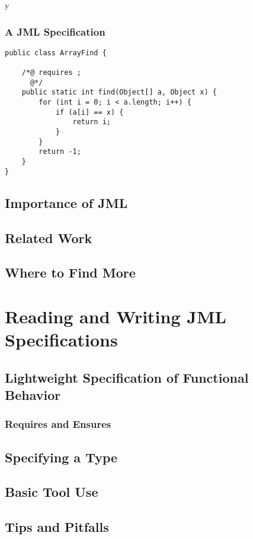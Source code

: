 \if y\MAKEHANDOUTS \documentclass[compress,landscape,handout]{beamer}
\begin{document}
\begin{frame}[fragile]
\frametitle{A JML Specification}
\begin{lstlisting}
public class ArrayFind {

    /*@ requires ;
      @*/
    public static int find(Object[] a, Object x) {
        for (int i = 0; i < a.length; i++) {
            if (a[i] == x) {
                return i;
            }
        }
        return -1;
    }
}
\end{lstlisting}
\end{frame}

\subsection[Importance]{Importance of JML}

\subsection[Related]{Related Work}

\subsection[Finding More]{Where to Find More}

\section[Reading and Writing]{Reading and Writing JML Specifications}

\subsection[Lightweight]{Lightweight Specification of Functional Behavior}

\begin{frame}
\frametitle{Requires and Ensures}
\end{frame}

\subsection[Exercise]{Specifying a Type}

\subsection[Tool Use]{Basic Tool Use}  %

\subsection[Tips]{Tips and Pitfalls}
\end{document}
